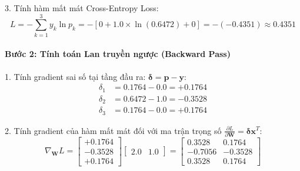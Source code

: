 \begin{example}
3. Tính hàm mất mát Cross-Entropy Loss:
\begin{equation*}
L = - \sum_{k=1}^3 y_k \ln p_k = - [0 + 1.0 \times \ln(0.6472) + 0] = - (-0.4351) \approx 0.4351
\end{equation*}

\paragraph{Bước 2: Tính toán Lan truyền ngược (Backward Pass)}
1. Tính gradient sai số tại tầng đầu ra: $\boldsymbol{\delta} = \mathbf{p} - \mathbf{y}$:
\begin{align*}
\delta_1 &= 0.1764 - 0.0 = +0.1764 \\
\delta_2 &= 0.6472 - 1.0 = -0.3528 \\
\delta_3 &= 0.1764 - 0.0 = +0.1764
\end{align*}

2. Tính gradient của hàm mất mát đối với ma trận trọng số $\frac{\partial L}{\partial \mathbf{W}} = \boldsymbol{\delta} \mathbf{x}^T$:
\begin{equation*}
\nabla_\mathbf{W} L = \begin{bmatrix} +0.1764 \\ -0.3528 \\ +0.1764 \end{bmatrix} \begin{bmatrix} 2.0 & 1.0 \end{bmatrix} = \begin{bmatrix} 0.3528 & 0.1764 \\ -0.7056 & -0.3528 \\ 0.3528 & 0.1764 \end{bmatrix}
\end{equation*}


\end{example}
